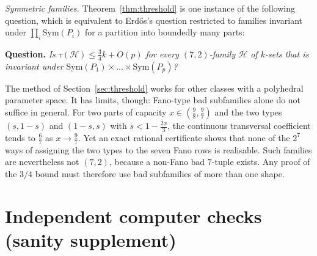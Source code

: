 \documentclass[11pt]{amsart}
\theoremstyle{definition}
\theoremstyle{remark}
\begin{document}
\emph{Symmetric families.} Theorem~\ref{thm:threshold} is one instance of the following question, which is equivalent to Erd\H{o}s's question restricted to families invariant under $\prod_i\mathrm{Sym}(P_i)$ for a partition into boundedly many parts:

\smallskip
\noindent\textbf{Question.} \emph{Is $\tau(\mathcal H)\le\frac34k+O(p)$ for every $(7,2)$-family $\mathcal H$ of $k$-sets that is invariant under $\mathrm{Sym}(P_1)\times\dots\times\mathrm{Sym}(P_p)$?}
\smallskip

The method of Section~\ref{sec:threshold} works for other classes with a polyhedral parameter space. It has limits, though: Fano-type bad subfamilies alone do not suffice in general. For two parts of capacity $x\in(\frac98,\frac97)$ and the two types $(s,1-s)$ and $(1-s,s)$ with $s<1-\frac{2x}3$, the continuous transversal coefficient tends to $\frac67$ as $x\to\frac97$. Yet an exact rational certificate shows that none of the $2^7$ ways of assigning the two types to the seven Fano rows is realisable. Such families are nevertheless not $(7,2)$, because a non-Fano bad $7$-tuple exists. Any proof of the $3/4$ bound must therefore use bad subfamilies of more than one shape.

\appendix
\section{Independent computer checks (sanity supplement)}\label{app:checks}
\end{document}
